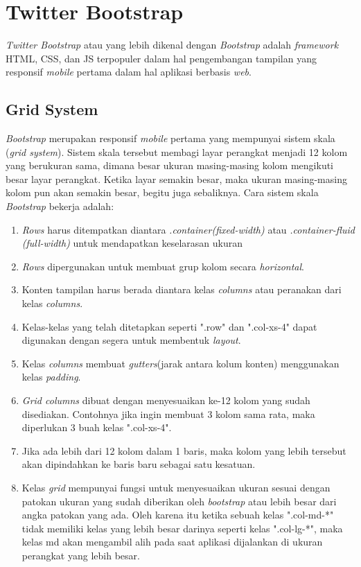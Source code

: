 \section{Twitter Bootstrap}
\label{sec: Bootrstrap}

\textit{Twitter Bootstrap}\cite{bootstrap} atau yang lebih dikenal dengan \textit{Bootstrap} adalah \textit{framework} HTML, CSS, dan JS terpopuler dalam hal pengembangan tampilan yang responsif \textit{mobile} pertama dalam hal aplikasi berbasis \textit{web}. 

\subsection{Grid System}
\label{sub: gridSystem}

\textit{Bootstrap} merupakan responsif \textit{mobile} pertama yang mempunyai sistem skala (\textit{grid system}). Sistem skala tersebut membagi layar perangkat menjadi 12 kolom yang berukuran sama, dimana besar ukuran masing-masing kolom mengikuti besar layar perangkat. Ketika layar semakin besar, maka ukuran masing-masing kolom pun akan semakin besar, begitu juga sebaliknya. Cara sistem skala \textit{Bootstrap} bekerja adalah:

\begin{enumerate}
	\item \textit{Rows} harus ditempatkan diantara \textit{.container(fixed-width)} atau \textit{.container-fluid (full-width)} untuk mendapatkan keselarasan ukuran
	\item \textit{Rows} dipergunakan untuk membuat grup kolom secara \textit{horizontal}.
	\item Konten tampilan harus berada diantara kelas \textit{columns} atau peranakan dari kelas \textit{columns}.
	\item Kelas-kelas yang telah ditetapkan seperti ".row" dan ".col-xs-4" dapat digunakan dengan segera untuk membentuk \textit{layout}.
	\item Kelas \textit{columns} membuat \textit{gutters}(jarak antara kolum konten) menggunakan kelas \textit{padding}.
	\item \textit{Grid columns} dibuat dengan menyesuaikan ke-12 kolom yang sudah disediakan. Contohnya jika ingin membuat 3 kolom sama rata, maka diperlukan 3 buah kelas ".col-xs-4".
	\item Jika ada lebih dari 12 kolom dalam 1 baris, maka kolom yang lebih tersebut akan dipindahkan ke baris baru sebagai satu kesatuan.
	\item Kelas \textit{grid} mempunyai fungsi untuk menyesuaikan ukuran sesuai dengan patokan ukuran yang sudah diberikan oleh \textit{bootstrap} atau lebih besar dari angka patokan yang ada. Oleh karena itu ketika sebuah kelas ".col-md-*" tidak memiliki kelas yang lebih besar darinya seperti kelas ".col-lg-*", maka kelas md akan mengambil alih pada saat aplikasi dijalankan di ukuran perangkat yang lebih besar. 
\end{enumerate}
	
